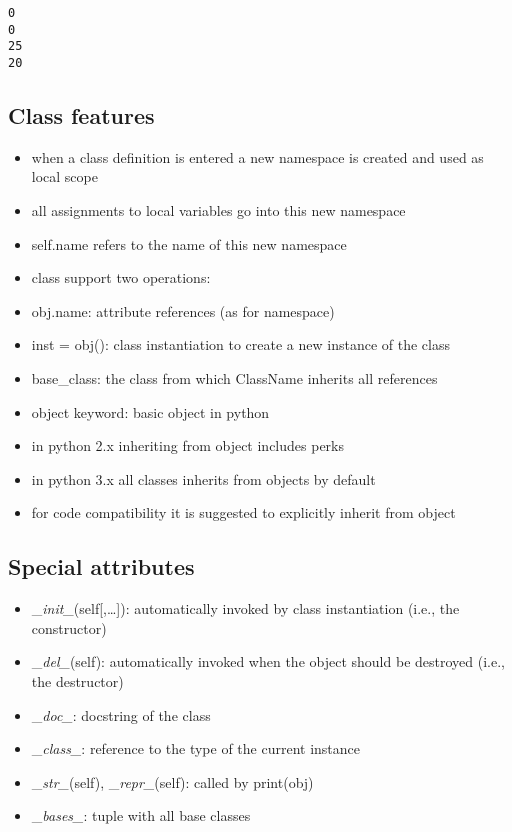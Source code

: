 \documentclass[11pt]{article}
\providecommand{\tightlist}{%
      \setlength{\itemsep}{0pt}\setlength{\parskip}{0pt}}
\begin{document}
    \begin{Verbatim}[commandchars=\\\{\}]
0
0
25
20
    \end{Verbatim}

    \hypertarget{class-features}{%
\subsection{Class features}\label{class-features}}

\begin{itemize}
\tightlist
\item
  when a class definition is entered a new namespace is created and used
  as local scope
\item
  all assignments to local variables go into this new namespace
\item
  self.name refers to the name of this new namespace
\item
  class support two operations:
\item
  obj.name: attribute references (as for namespace)
\item
  inst = obj(): class instantiation to create a new instance of the
  class\\
\item
  base\_class: the class from which ClassName inherits all references
\item
  object keyword: basic object in python
\item
  in python 2.x inheriting from object includes perks
\item
  in python 3.x all classes inherits from objects by default
\item
  for code compatibility it is suggested to explicitly inherit from
  object
\end{itemize}

\hypertarget{special-attributes}{%
\subsection{Special attributes}\label{special-attributes}}

\begin{itemize}
\tightlist
\item
  \_\emph{init\_}(self{[},\ldots{]}): automatically invoked by class
  instantiation (i.e., the constructor)
\item
  \_\emph{del\_}(self): automatically invoked when the object should be
  destroyed (i.e., the destructor)
\item
  \_\emph{doc\_}: docstring of the class
\item
  \_\emph{class\_}: reference to the type of the current instance
\item
  \_\emph{str\_}(self), \_\emph{repr\_}(self): called by print(obj)
\item
  \_\emph{bases\_}: tuple with all base classes
\end{itemize}
\end{document}
